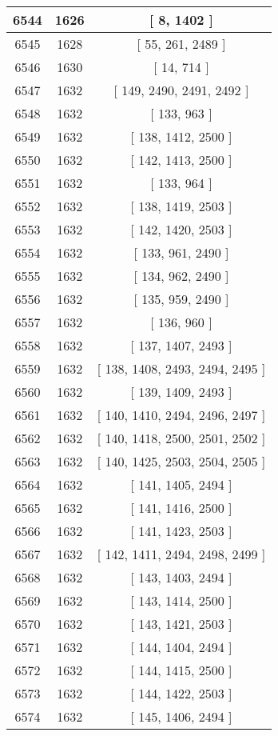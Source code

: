 \begin{center}
\begin{longtable}[H]{|| c c c ||}
\hline
6544 & 1626 & [ 8, 1402 ] \\ 
\hline
6545 & 1628 & [ 55, 261, 2489 ] \\ 
\hline
6546 & 1630 & [ 14, 714 ] \\ 
\hline
6547 & 1632 & [ 149, 2490, 2491, 2492 ] \\ 
\hline
6548 & 1632 & [ 133, 963 ] \\ 
\hline
6549 & 1632 & [ 138, 1412, 2500 ] \\ 
\hline
6550 & 1632 & [ 142, 1413, 2500 ] \\ 
\hline
6551 & 1632 & [ 133, 964 ] \\ 
\hline
6552 & 1632 & [ 138, 1419, 2503 ] \\ 
\hline
6553 & 1632 & [ 142, 1420, 2503 ] \\ 
\hline
6554 & 1632 & [ 133, 961, 2490 ] \\ 
\hline
6555 & 1632 & [ 134, 962, 2490 ] \\ 
\hline
6556 & 1632 & [ 135, 959, 2490 ] \\ 
\hline
6557 & 1632 & [ 136, 960 ] \\ 
\hline
6558 & 1632 & [ 137, 1407, 2493 ] \\ 
\hline
6559 & 1632 & [ 138, 1408, 2493, 2494, 2495 ] \\ 
\hline
6560 & 1632 & [ 139, 1409, 2493 ] \\ 
\hline
6561 & 1632 & [ 140, 1410, 2494, 2496, 2497 ] \\ 
\hline
6562 & 1632 & [ 140, 1418, 2500, 2501, 2502 ] \\ 
\hline
6563 & 1632 & [ 140, 1425, 2503, 2504, 2505 ] \\ 
\hline
6564 & 1632 & [ 141, 1405, 2494 ] \\ 
\hline
6565 & 1632 & [ 141, 1416, 2500 ] \\ 
\hline
6566 & 1632 & [ 141, 1423, 2503 ] \\ 
\hline
6567 & 1632 & [ 142, 1411, 2494, 2498, 2499 ] \\ 
\hline
6568 & 1632 & [ 143, 1403, 2494 ] \\ 
\hline
6569 & 1632 & [ 143, 1414, 2500 ] \\ 
\hline
6570 & 1632 & [ 143, 1421, 2503 ] \\ 
\hline
6571 & 1632 & [ 144, 1404, 2494 ] \\ 
\hline
6572 & 1632 & [ 144, 1415, 2500 ] \\ 
\hline
6573 & 1632 & [ 144, 1422, 2503 ] \\ 
\hline
6574 & 1632 & [ 145, 1406, 2494 ] \\ 

\end{longtable}
\end{center}
